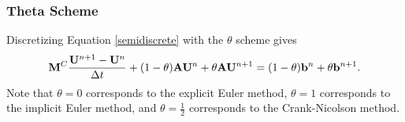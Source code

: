 \subsubsection{Theta Scheme}\label{theta}
Discretizing Equation \eqref{semidiscrete} with the $\theta$ scheme gives
\begin{equation}\label{galerkin_theta}
  \mathbf{M}^C\frac{\mathbf{U}^{n+1}-\mathbf{U}^n}{\Delta t}
  + (1-\theta)\mathbf{A}\mathbf{U}^n + \theta\mathbf{A}\mathbf{U}^{n+1}
  = (1-\theta)\mathbf{b}^n + \theta\mathbf{b}^{n+1}.
\end{equation}
Note that $\theta=0$ corresponds to the explicit Euler method,
$\theta=1$ corresponds to the implicit Euler method, and $\theta=\frac{1}{2}$
corresponds to the Crank-Nicolson method.

